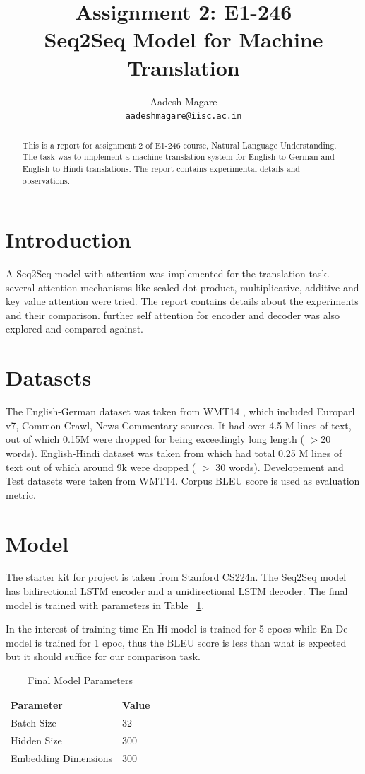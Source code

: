 \documentclass[11pt,a4paper]{article}
\title{Assignment 2: E1-246 \\
Seq2Seq Model for Machine Translation}
\author{Aadesh Magare \\
  \texttt{aadeshmagare@iisc.ac.in} \\}
\date{}
\begin{document}
\maketitle
\begin{abstract}
  This is a report for assignment 2 of E1-246 course, Natural Language Understanding. The task was to implement a machine translation system for English to German and English to Hindi translations. The report contains experimental details and observations.
\end{abstract}

\section{Introduction}

A Seq2Seq model with attention was implemented for the translation task.
several attention mechanisms like scaled dot product, multiplicative, additive and key value attention were tried. The report contains details about the experiments and their comparison. further self attention for encoder and decoder was also explored and compared against.

\section{Datasets}
The English-German dataset was taken from WMT14 \cite{WMT}, which included Europarl v7, Common Crawl, News Commentary sources. It had over 4.5 M lines of text, out of which 0.15M were dropped for being exceedingly long length ( $>$20 words).
English-Hindi dataset was taken from \cite{ufal} which had total 0.25 M lines of text out of which around 9k were dropped ( $>$ 30 words). 
Developement and Test datasets were taken from WMT14. Corpus BLEU score is used as evaluation metric.

\section{Model}
The starter kit for project is taken from Stanford CS224n. \cite{224n} The Seq2Seq model has bidirectional LSTM encoder and a unidirectional LSTM decoder. The final model is trained with parameters in Table ~\ref{table1}.

In the interest of training time En-Hi model is trained for 5 epocs while En-De model is trained for 1 epoc, thus the BLEU score is less than what is expected but it should suffice for our comparison task.

\begin{table}[h]
\centering
\begin{tabular}{|l|l|}
\hline
\textbf{Parameter} & \textbf{Value} \\ \hline
Batch Size  & 32                          \\ \hline
Hidden Size  & 300                         \\ \hline
Embedding Dimensions & 300                         \\ \hline
\end{tabular}
\caption{Final Model Parameters}
\label{table1}
\end{table}
\end{document}
